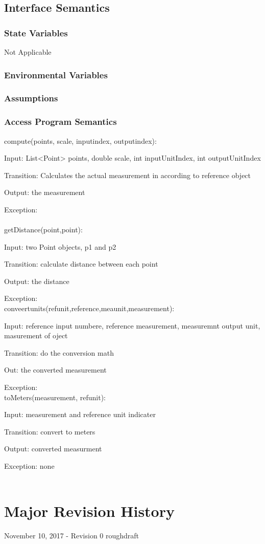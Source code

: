\documentclass[12,english]{article}
\begin{document}
	\subsection{Interface Semantics}
		\subsubsection{State Variables}
		Not Applicable
		\subsubsection{Environmental Variables}
	
		\subsubsection{Assumptions}

		\subsubsection{Access Program Semantics}
		compute(points, scale, inputindex, outputindex):
		
		Input: List<Point> points, double scale, int inputUnitIndex, int outputUnitIndex
		
		Transition: Calculates the actual measurement in according to reference object 
		
		Output: the measurement 
		
		Exception: \\
		\\
		getDistance(point,point):
		
		Input: two Point objects, p1 and p2
		
		Transition: calculate distance between each point
		
		Output: the distance
		
		Exception:
		\\
		conveertunits(refunit,reference,meaunit,measurement):

		Input: reference input numbere, reference measurement, measuremnt output unit, masurement of oject
		
		Transition: do the conversion math
		
		Out: the converted measurement
		
		Exception: 
		\\
	
		toMeters(measurement, refunit):
		
		Input: measurement and reference unit indicater 
		
		Transition: convert to meters
		
		Output: converted measurment
		
		Exception: none\\
		\\
		
\section{Major Revision History}

November 10, 2017 - Revision 0 roughdraft

			
\end{document}
